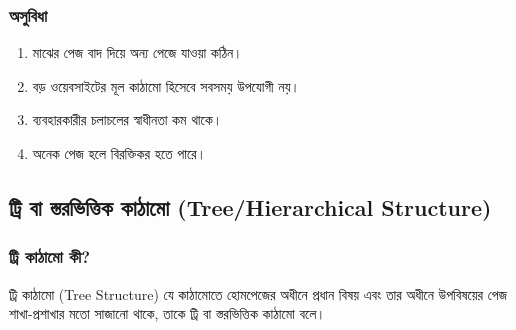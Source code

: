 \begin{minipage}[t]{.48\linewidth}\vspace{0pt}
\subsubsection{অসুবিধা}
\begin{enumerate}
\item মাঝের পেজ বাদ দিয়ে অন্য পেজে যাওয়া কঠিন।
\item বড় ওয়েবসাইটের মূল কাঠামো হিসেবে সবসময় উপযোগী নয়।
\item ব্যবহারকারীর চলাচলের স্বাধীনতা কম থাকে।
\item অনেক পেজ হলে বিরক্তিকর হতে পারে।
\end{enumerate}
\end{minipage}\par

\subsection{ট্রি বা স্তরভিত্তিক কাঠামো (Tree/Hierarchical Structure)}

\subsubsection{ট্রি কাঠামো কী?}

\begin{definitionbox}{ট্রি কাঠামো (Tree Structure)}
যে কাঠামোতে হোমপেজের অধীনে প্রধান বিষয় এবং তার অধীনে উপবিষয়ের পেজ শাখা-প্রশাখার মতো সাজানো থাকে, তাকে ট্রি বা স্তরভিত্তিক কাঠামো বলে।
\end{definitionbox}

\begin{center}
\end{center}


